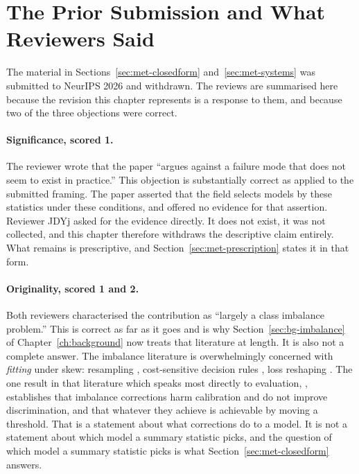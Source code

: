 \section{The Prior Submission and What Reviewers Said}
\label{sec:met-prior}

The material in Sections~\ref{sec:met-closedform} and~\ref{sec:met-systems} was
submitted to NeurIPS 2026 and withdrawn. The reviews are summarised here because
the revision this chapter represents is a response to them, and because two of
the three objections were correct.

\paragraph{Significance, scored 1.} The reviewer wrote that the paper ``argues
against a failure mode that does not seem to exist in practice.'' This objection
is substantially correct as applied to the submitted framing. The paper asserted
that the field selects models by these statistics under these conditions, and
offered no evidence for that assertion. Reviewer JDYj asked for the evidence
directly. It does not exist, it was not collected, and this chapter therefore
withdraws the descriptive claim entirely. What remains is prescriptive, and
Section~\ref{sec:met-prescription} states it in that form.

\paragraph{Originality, scored 1 and 2.} Both reviewers characterised the
contribution as ``largely a class imbalance problem.'' This is correct as far as
it goes and is why Section~\ref{sec:bg-imbalance} of Chapter~\ref{ch:background}
now treats that literature at length. It is also not a complete answer. The
imbalance literature is overwhelmingly concerned with \emph{fitting} under skew:
resampling \citep{chawla2002smote}, cost-sensitive decision rules
\citep{elkan2001cost}, loss reshaping
\citep{lin2017focal,cui2019classbalanced,cao2019ldam,menon2021logitadjust}. The
one result in that literature which speaks most directly to evaluation,
\citet{vandengoorbergh2022harm}, establishes that imbalance corrections harm
calibration and do not improve discrimination, and that whatever they achieve is
achievable by moving a threshold. That is a statement about what corrections do
to a model. It is not a statement about which model a summary statistic picks,
and the question of which model a summary statistic picks is what
Section~\ref{sec:met-closedform} answers.

